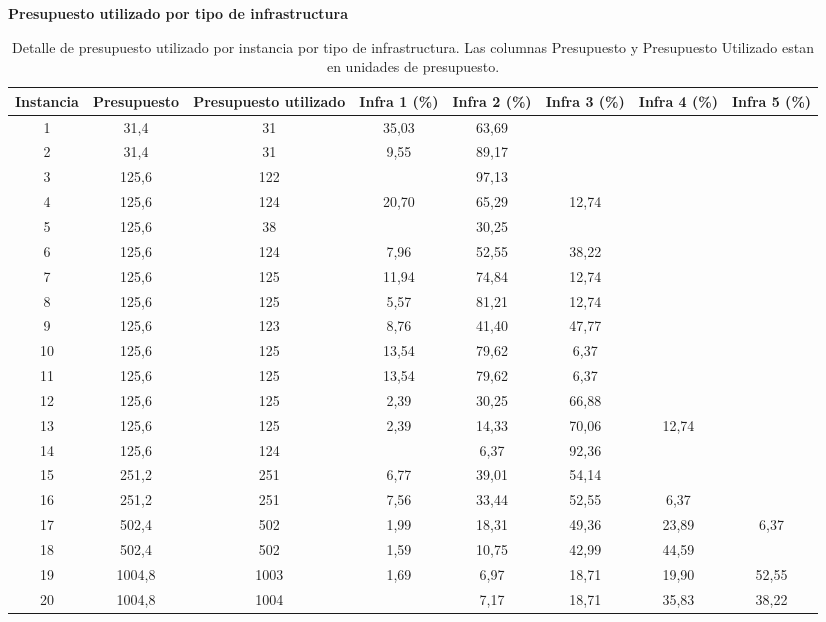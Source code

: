 \documentclass{article}
\begin{document}
  \begin{table}
    \centering
    \caption*{{\bf Presupuesto utilizado por tipo de infrastructura}}
    \begin{tabular}{cccccccc}
        \toprule
        Instancia & Presupuesto & Presupuesto utilizado & Infra 1 (\%) & Infra 2 (\%) & Infra 3 (\%) & Infra 4 (\%) & Infra 5 (\%) \\
        \midrule
        1 & 31,4 & 31 & 35,03 & 63,69 &  &  &  \\
        2 & 31,4 & 31 & 9,55 & 89,17 &  &  &  \\
        3 & 125,6 & 122 &  & 97,13 &  &  &  \\
        4 & 125,6 & 124 & 20,70 & 65,29 & 12,74 &  &  \\
        5 & 125,6 & 38 &  & 30,25 &  &  &  \\
        6 & 125,6 & 124 & 7,96 & 52,55 & 38,22 &  &  \\
        7 & 125,6 & 125 & 11,94 & 74,84 & 12,74 &  &  \\
        8 & 125,6 & 125 & 5,57 & 81,21 & 12,74 &  &  \\
        9 & 125,6 & 123 & 8,76 & 41,40 & 47,77 &  &  \\
        10 & 125,6 & 125 & 13,54 & 79,62 & 6,37 &  &  \\
        11 & 125,6 & 125 & 13,54 & 79,62 & 6,37 &  &  \\
        12 & 125,6 & 125 & 2,39 & 30,25 & 66,88 &  &  \\
        13 & 125,6 & 125 & 2,39 & 14,33 & 70,06 & 12,74 &  \\
        14 & 125,6 & 124 &  & 6,37 & 92,36 &  &  \\
        15 & 251,2 & 251 & 6,77 & 39,01 & 54,14 &  &  \\
        16 & 251,2 & 251 & 7,56 & 33,44 & 52,55 & 6,37 &  \\
        17 & 502,4 & 502 & 1,99 & 18,31 & 49,36 & 23,89 & 6,37 \\
        18 & 502,4 & 502 & 1,59 & 10,75 & 42,99 & 44,59 &  \\
        19 & 1004,8 & 1003 & 1,69 & 6,97 & 18,71 & 19,90 & 52,55 \\
        20 & 1004,8 & 1004 &  & 7,17 & 18,71 & 35,83 & 38,22 \\
        \bottomrule
    \end{tabular}
      \caption{Detalle de presupuesto utilizado por instancia por tipo de infrastructura. Las columnas Presupuesto y Presupuesto Utilizado estan en unidades de presupuesto.} \label{table:sensibilityresults}
  \end{table}
\end{document}
